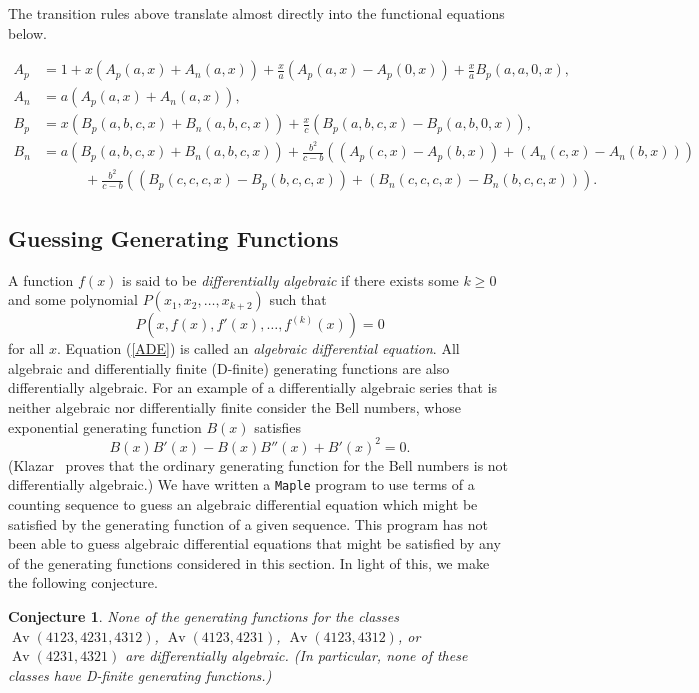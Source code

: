 \documentclass[10pt]{article}
\theoremstyle{plain}
\newtheorem{conjecture}[theorem]{Conjecture}
\theoremstyle{definition}
\newcommand{\Av}{\operatorname{Av}}
\begin{document}
The transition rules above translate almost directly into the functional equations below.

\begin{align*}
	A_p &= 1 + x(A_p(a,x) + A_n(a,x)) + \frac{x}{a}(A_p(a,x) - A_p(0,x)) + \frac{x}{a}B_p(a,a,0,x),\\
	A_n &= a(A_p(a,x) + A_n(a,x)),\\
	B_p &= x(B_p(a,b,c,x) + B_n(a,b,c,x)) + \frac{x}{c}(B_p(a,b,c,x) - B_p(a,b,0,x)),\\
	B_n &= a(B_p(a,b,c,x) + B_n(a,b,c,x)) + \frac{b^2}{c-b}((A_p(c,x) - A_p(b,x)) + (A_n(c,x) - A_n(b,x)))\\
	&\qquad\quad + \frac{b^2}{c-b}((B_p(c,c,c,x) - B_p(b,c,c,x)) + (B_n(c,c,c,x) - B_n(b,c,c,x))).
\end{align*}

\subsection{Guessing Generating Functions}

A function $f(x)$ is said to be \emph{differentially algebraic} if there exists some $k \geq 0$ and some polynomial $P(x_1, x_2, \ldots, x_{k+2})$ such that
	\[P(x, f(x), f'(x), \ldots, f^{(k)}(x)) = 0\tag{$\star$}\label{ADE}\]
for all $x$. Equation (\ref{ADE}) is called an \emph{algebraic differential equation}. All algebraic and differentially finite (D-finite) generating functions are also differentially algebraic. For an example of a differentially algebraic series that is neither algebraic nor differentially finite consider the Bell numbers, whose exponential generating function $B(x)$ satisfies
\[
	B(x)B'(x) - B(x)B''(x) + B'(x)^2 = 0.
\]
(Klazar~\cite{Klazar:Bell-numbers-th:} proves that the ordinary generating function for the Bell numbers is not differentially algebraic.) 
We have written a \texttt{Maple} program to use terms of a counting sequence to guess an algebraic differential equation which might be satisfied by the generating function of a given sequence. This program has not been able to guess algebraic differential equations that might be satisfied by any of the generating functions considered in this section. In light of this, we make the following conjecture.

\begin{conjecture}
\label{conj-non-ADE}
	None of the generating functions for the classes $\Av(4123,4231,4312)$, \linebreak $\Av(4123,4231)$, $\Av(4123,4312)$, or $\Av(4231,4321)$ are differentially algebraic. (In particular, none of these classes have D-finite generating functions.)
\end{conjecture}
\end{document}
